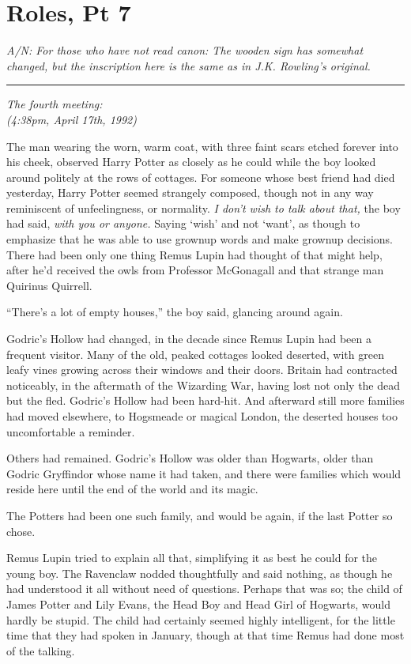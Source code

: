 \chapter{Roles, Pt 7}\label{roles-pt-7}

\emph{A/N: For those who have not read canon: The wooden sign has
somewhat changed, but the inscription here is the same as in J.K.
Rowling's original.}

\begin{center}\rule{3in}{0.4pt}\end{center}

\emph{The fourth meeting:\\ (4:38pm, April 17th, 1992)}

The man wearing the worn, warm coat, with three faint scars etched
forever into his cheek, observed Harry Potter as closely as he could
while the boy looked around politely at the rows of cottages. For
someone whose best friend had died yesterday, Harry Potter seemed
strangely composed, though not in any way reminiscent of unfeelingness,
or normality. \emph{I don't wish to talk about that,} the boy had said,
\emph{with you or anyone.} Saying `wish' and not `want', as though to
emphasize that he was able to use grownup words and make grownup
decisions. There had been only one thing Remus Lupin had thought of that
might help, after he'd received the owls from Professor McGonagall and
that strange man Quirinus Quirrell.

``There's a lot of empty houses,'' the boy said, glancing around again.

Godric's Hollow had changed, in the decade since Remus Lupin had been a
frequent visitor. Many of the old, peaked cottages looked deserted, with
green leafy vines growing across their windows and their doors. Britain
had contracted noticeably, in the aftermath of the Wizarding War, having
lost not only the dead but the fled. Godric's Hollow had been hard-hit.
And afterward still more families had moved elsewhere, to Hogsmeade or
magical London, the deserted houses too uncomfortable a reminder.

Others had remained. Godric's Hollow was older than Hogwarts, older than
Godric Gryffindor whose name it had taken, and there were families which
would reside here until the end of the world and its magic.

The Potters had been one such family, and would be again, if the last
Potter so chose.

Remus Lupin tried to explain all that, simplifying it as best he could
for the young boy. The Ravenclaw nodded thoughtfully and said nothing,
as though he had understood it all without need of questions. Perhaps
that was so; the child of James Potter and Lily Evans, the Head Boy and
Head Girl of Hogwarts, would hardly be stupid. The child had certainly
seemed highly intelligent, for the little time that they had spoken in
January, though at that time Remus had done most of the talking.


